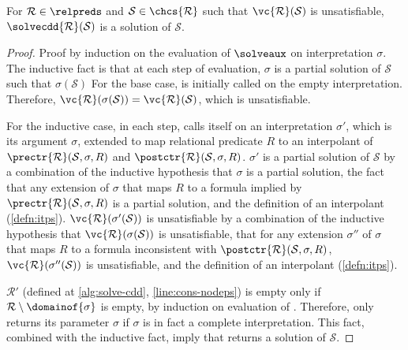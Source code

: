 \begin{lem}
  \label{lem:solve-aux}
  For $\mathcal{R} \in \relpreds$ and $\mathcal{S} \in \chcs{
    \mathcal{R} }$ such that $\vc{ \mathcal{R} }(\mathcal{S})$ is
  unsatisfiable, $\solvecdd{ \mathcal{R} }(\mathcal{S})$ is a solution
  of $\mathcal{S}$.
\end{lem}
%
\begin{proof}
  Proof by induction on the evaluation of $\solveaux$ on
  interpretation $\sigma$.
  The inductive fact is that at each step of evaluation, $\sigma$ is a
  partial solution of $\mathcal{S}$ such that $\sigma(\mathcal{S})$
  For the base case, \solveaux is initially called on the empty
  interpretation.
  Therefore, $\vc{\mathcal{R}}(\sigma(\mathcal{S})) = \vc{
    \mathcal{R}}(\mathcal{S})$, which is unsatisfiable.

  For the inductive case, in each step, \solveaux calls itself on an
  interpretation $\sigma'$, which is its argument $\sigma$, extended
  to map relational predicate $R$ to an interpolant of $\prectr{
    \mathcal{R} }( \mathcal{S}, \sigma, R)$ and $\postctr{ \mathcal{R}
  }( \mathcal{S}, \sigma, R)$.
  $\sigma'$ is a partial solution of $\mathcal{S}$ by a combination of
  the inductive hypothesis that $\sigma$ is a partial solution, the
  fact that any extension of $\sigma$ that maps $R$ to a formula
  implied by $\prectr{ \mathcal{R} }( \mathcal{S}, \sigma, R)$ is a
  partial solution, and the definition of an interpolant
  (\autoref{defn:itps}).
  $\vc{ \mathcal{R} }(\sigma'(\mathcal{S}))$ is unsatisfiable by a
  combination of the inductive hypothesis that $\vc{ \mathcal{R}
  }(\sigma(\mathcal{ S }))$ is unsatisfiable, that for any extension
  $\sigma''$ of $\sigma$ that maps $R$ to a formula inconsistent with
  $\postctr{ \mathcal{R} }( \mathcal{S}, \sigma, R)$, $\vc{
    \mathcal{R} }(\sigma''(\mathcal{S}))$ is unsatisfiable, and the
  definition of an interpolant (\autoref{defn:itps}).

  $\mathcal{R}'$ (defined at \autoref{alg:solve-cdd},
  \autoref{line:cons-nodeps}) is empty only if $\mathcal{R} \setminus
  \domainof{ \sigma }$ is empty, by induction on evaluation of
  \solveaux.
  Therefore, \solveaux only returns its parameter $\sigma$ if $\sigma$
  is in fact a complete interpretation.
  This fact, combined with the inductive fact, imply that \solveaux
  returns a solution of $\mathcal{S}$.
\end{proof}

